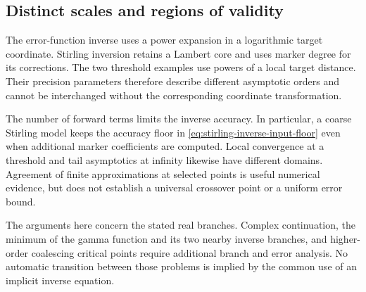 \subsection{Distinct scales and regions of validity}

The error-function inverse uses a power expansion in a logarithmic target
coordinate. Stirling inversion retains a Lambert core and uses marker
degree for its corrections. The two threshold examples use powers of a
local target distance. Their precision parameters therefore describe
different asymptotic orders and cannot be interchanged without the
corresponding coordinate transformation.

The number of forward terms limits the inverse accuracy. In particular,
a coarse Stirling model keeps the accuracy floor in
\eqref{eq:stirling-inverse-input-floor} even when additional marker
coefficients are computed. Local convergence at a threshold and tail
asymptotics at infinity likewise have different domains. Agreement of
finite approximations at selected points is useful numerical evidence,
but does not establish a universal crossover point or a uniform error bound.

The arguments here concern the stated real branches. Complex continuation,
the minimum of the gamma function and its two nearby inverse branches,
and higher-order coalescing critical points require additional branch and
error analysis. No automatic transition between those problems is implied
by the common use of an implicit inverse equation.
